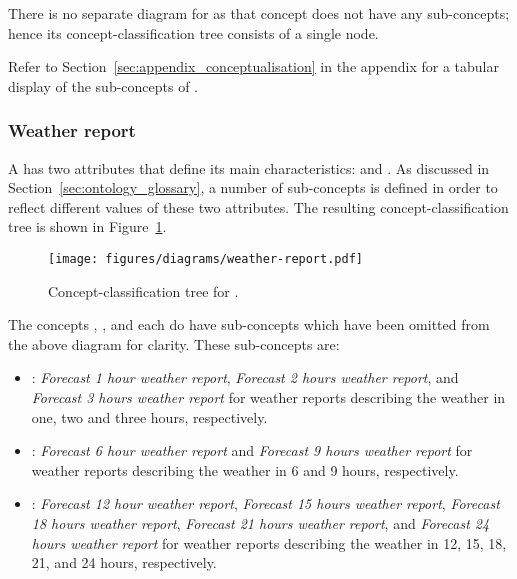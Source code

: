 There is no separate diagram for  as that concept does not have any sub-concepts; hence its concept-classification tree consists of a single node.

Refer to Section~\ref{sec:appendix_conceptualisation} in the appendix for a tabular display of the sub-concepts of .

\subsubsection{Weather report}

A  has two attributes that define its main characteristics:  and . As discussed in Section~\ref{sec:ontology_glossary}, a number of sub-concepts is defined in order to reflect different values of these two attributes. The resulting concept-classification tree is shown in Figure~\ref{fig:tree_weather_report}.

\begin{figure}
  \centering
  \texttt{[image: figures/diagrams/weather-report.pdf]}
  \caption[Concept-classification tree for ]{Concept-classification tree for .}
  \label{fig:tree_weather_report}
\end{figure}

The concepts , , and  each do have sub-concepts which have been omitted from the above diagram for clarity. These sub-concepts are:
\begin{itemize}
  \item {}: \emph{Forecast 1 hour weather report}, \emph{Forecast 2 hours weather report}, and \emph{Forecast 3 hours weather report} for weather reports describing the weather in one, two and three hours, respectively.
  \item {}: \emph{Forecast 6 hour weather report} and \emph{Forecast 9 hours weather report} for weather reports describing the weather in 6 and 9 hours, respectively.
  \item {}: \emph{Forecast 12 hour weather report}, \emph{Forecast 15 hours weather report}, \emph{Forecast 18 hours weather report}, \emph{Forecast 21 hours weather report}, and \emph{Forecast 24 hours weather report} for weather reports describing the weather in 12, 15, 18, 21, and 24 hours, respectively.
\end{itemize}


